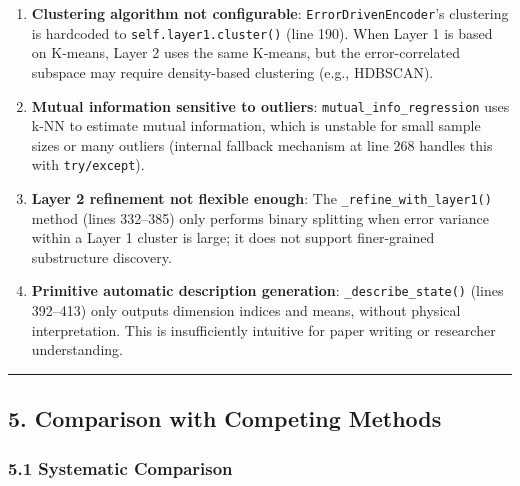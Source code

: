 \documentclass[
  12pt,
]{article}
\begin{document}
\begin{enumerate}
\def\labelenumi{\arabic{enumi}.}
\item
  \textbf{Clustering algorithm not configurable}: \texttt{ErrorDrivenEncoder}'s clustering is hardcoded to \texttt{self.layer1.cluster()} (line 190). When Layer 1 is based on K-means, Layer 2 uses the same K-means, but the error-correlated subspace may require density-based clustering (e.g., HDBSCAN).
\item
  \textbf{Mutual information sensitive to outliers}: \texttt{mutual\_info\_regression} uses k-NN to estimate mutual information, which is unstable for small sample sizes or many outliers (internal fallback mechanism at line 268 handles this with \texttt{try/except}).
\item
  \textbf{Layer 2 refinement not flexible enough}: The \texttt{\_refine\_with\_layer1()} method (lines 332--385) only performs binary splitting when error variance within a Layer 1 cluster is large; it does not support finer-grained substructure discovery.
\item
  \textbf{Primitive automatic description generation}: \texttt{\_describe\_state()} (lines 392--413) only outputs dimension indices and means, without physical interpretation. This is insufficiently intuitive for paper writing or researcher understanding.
\end{enumerate}

\begin{center}\rule{0.5\linewidth}{0.5pt}\end{center}

\subsection{5. Comparison with Competing Methods}\label{comparison-with-competing-methods}

\subsubsection{5.1 Systematic Comparison}\label{systematic-comparison}
\end{document}

